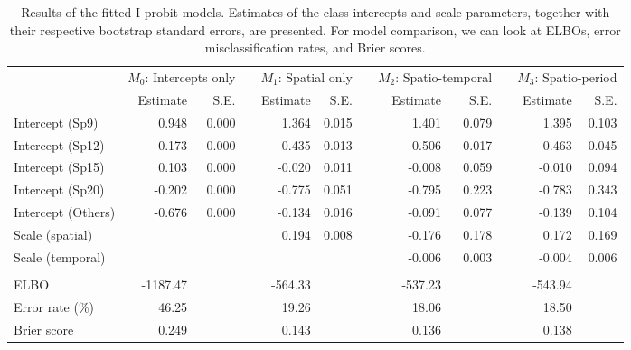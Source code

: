 \documentclass[showframe,11pt]{report}\usepackage[]{graphicx}\usepackage{xcolor}
\begin{document}
\begin{table}
\caption[Results of the fitted I-probit models for the BTB contraction data set]{\label{tab:table.btb}Results of the fitted I-probit models. Estimates of the class intercepts and scale parameters, together with their respective bootstrap standard errors, are presented. For model comparison, we can look at ELBOs, error misclassification rates, and Brier scores.}
\centering
\begin{tabular}[t]{lrrrrrrrrrrr}
\toprule
\multicolumn{1}{c}{ } & \multicolumn{2}{r}{$M_0$: Intercepts only} & \multicolumn{1}{c}{ } & \multicolumn{2}{r}{$M_1$: Spatial only} & \multicolumn{1}{c}{ } & \multicolumn{2}{r}{$M_2$: Spatio-temporal} & \multicolumn{1}{c}{ } & \multicolumn{2}{r}{$M_3$: Spatio-period} \\
\cmidrule(l{2pt}r{2pt}){2-3} \cmidrule(l{2pt}r{2pt}){5-6} \cmidrule(l{2pt}r{2pt}){8-9} \cmidrule(l{2pt}r{2pt}){11-12}
  & Estimate & S.E. &   & Estimate & S.E. &   & Estimate & S.E. &   & Estimate & S.E.\\
\midrule
Intercept (Sp9) & 0.948 & 0.000 &  & 1.364 & 0.015 &  & 1.401 & 0.079 &  & 1.395 & 0.103\\
Intercept (Sp12) & -0.173 & 0.000 &  & -0.435 & 0.013 &  & -0.506 & 0.017 &  & -0.463 & 0.045\\
Intercept (Sp15) & 0.103 & 0.000 &  & -0.020 & 0.011 &  & -0.008 & 0.059 &  & -0.010 & 0.094\\
Intercept (Sp20) & -0.202 & 0.000 &  & -0.775 & 0.051 &  & -0.795 & 0.223 &  & -0.783 & 0.343\\
Intercept (Others) & -0.676 & 0.000 &  & -0.134 & 0.016 &  & -0.091 & 0.077 &  & -0.139 & 0.104\\[0.5em]
Scale (spatial) &  &  &  & 0.194 & 0.008 &  & -0.176 & 0.178 &  & 0.172 & 0.169\\
Scale (temporal) &  &  &  &  &  &  & -0.006 & 0.003 &  & -0.004 & 0.006\\
\\
ELBO & -1187.47 &  &  & -564.33 &  &  & -537.23 &  &  & -543.94 & \\
Error rate (\%) & 46.25 &  &  & 19.26 &  &  & 18.06 &  &  & 18.50 & \\
Brier score & 0.249 &  &  & 0.143 &  &  & 0.136 &  &  & 0.138 & \\
\bottomrule
\end{tabular}
\end{table}
\end{document}
